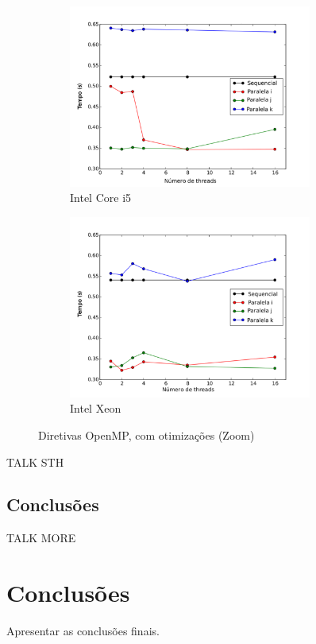 \documentclass[a4paper,12pt,fleqn]{article}
\begin{document}
\begin{figure} 
    \centering
    \begin{subfigure}{.5\textwidth}
        \centering
        \includegraphics[height=6cm]{Images/corei5cozoom} 
        \caption{Intel Core i5}
        \label{fig:corei5cozoom} 
    \end{subfigure}%
    \begin{subfigure}{.5\textwidth}
        \centering
        \includegraphics[height=6cm]{Images/xeoncozoom} 
        \caption{Intel Xeon}
        \label{fig:xeoncozoom} 
    \end{subfigure}    
    \caption{Diretivas OpenMP, com otimizações (Zoom)}
    \label{fig:cozoom}
\end{figure} 

TALK STH

\subsection{Conclusões} 

TALK MORE
 
\clearpage 
\section{Conclusões} 
Apresentar as conclusões finais. 
 
\clearpage 
 
\end{document}
